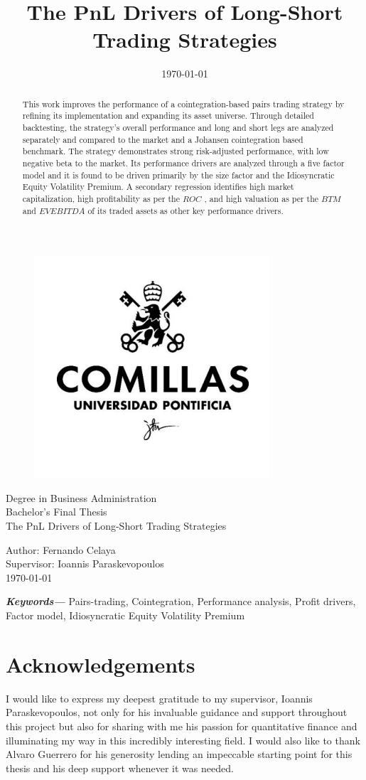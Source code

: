 \documentclass[12pt,a4paper,twoside]{article}
\title{The PnL Drivers of Long-Short Trading Strategies}
\date{\today}
\providecommand{\keywords}[1]
{
  \small	
  \textbf{\textit{Keywords---}} #1
}
\begin{document}
\pagestyle{empty}
\begin{titlepage}
  \begin{figure}
    \centering
    \includegraphics[width=0.3\linewidth]{assets/logo-comillas.png}
  \end{figure}
  \centering
  \Large 
  Degree in Business Administration \\ Bachelor's Final Thesis\\[36px]
  \Huge 
  The PnL Drivers of Long-Short Trading Strategies\\
  \Large
  \raggedright
  \vspace*{\fill}
  Author: Fernando Celaya\\
  Supervisor: Ioannis Paraskevopoulos\\
  \today

\end{titlepage}
\newpage

\begin{abstract}
  This work improves the performance of a cointegration-based pairs trading strategy by refining its implementation and expanding its asset universe. Through detailed backtesting, the strategy's overall performance and long and short legs are analyzed separately and compared to the market and a Johansen cointegration based benchmark. The strategy demonstrates strong risk-adjusted performance, with low negative beta to the market. Its performance drivers are analyzed through a five factor model and it is found to be driven primarily by the size factor and the Idiosyncratic Equity Volatility Premium. A secondary regression identifies high market capitalization, high profitability as per the $ROC$ , and high valuation as per the $BTM$ and $EVEBITDA$ of its traded assets as other key performance drivers. 
\end{abstract}
\keywords{Pairs-trading, Cointegration, Performance analysis, Profit drivers, Factor model, Idiosyncratic Equity Volatility Premium}
\newpage

\section*{Acknowledgements}
I would like to express my deepest gratitude to my supervisor, Ioannis Paraskevopoulos, not only for his invaluable guidance and support throughout this project but also for sharing with me his passion for quantitative finance and illuminating my way in this incredibly interesting field. I would also like to thank Alvaro Guerrero for his generosity lending an impeccable starting point for this thesis and his deep support whenever it was needed. 
\newpage
\end{document}
